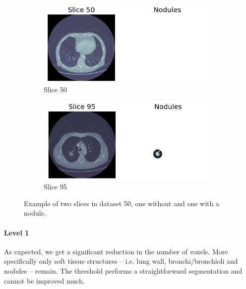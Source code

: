 \begin{figure}[ht]
\begin{center}
	\begin{subfigure}[b]{\linewidth}
		\includegraphics[width=\linewidth]{img/cascades/D50S50.png}
		\caption{Slice 50}
	\end{subfigure}
	\begin{subfigure}[b]{\linewidth}
		\includegraphics[width=\linewidth]{img/cascades/D50S95.png}
  		\caption{Slice 95}
	\end{subfigure}
	\caption{Example of two slices in dataset 50, one without and one with a
	nodule.}
	\label{fig:d50}
\end{center}
\end{figure}

\paragraph{Level 1}
As expected, we get a significant reduction in the number of voxels. More
specifically only soft tissue structures -- i.e. lung wall, bronchi/bronchioli
and nodules -- remain. The threshold performs a straightforward segmentation and
cannot be improved much.

